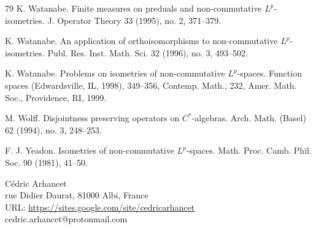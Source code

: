 \documentclass[leqno]{article} %
\numberwithin{equation}{section}
\begin{document}
\begin{thebibliography}{79}
K. Watanabe.
\newblock Finite measures on preduals and non-commutative $L^p$-isometries.
\newblock J. Operator Theory 33 (1995), no. 2, 371--379.

K. Watanabe.
\newblock An application of orthoisomorphisms to non-commutative $L^p$-isometries.
\newblock Publ. Res. Inst. Math. Sci. 32 (1996), no. 3, 493--502.

K. Watanabe.
\newblock Problems on isometries of non-commutative $L^p$-spaces.
\newblock Function spaces (Edwardsville, IL, 1998), 349--356, Contemp. Math., 232, Amer. Math. Soc., Providence, RI, 1999.





M. Wolff.
\newblock Disjointness preserving operators on $C^*$-algebras.
\newblock Arch. Math. (Basel) 62 (1994), no. 3, 248--253.


F. J. Yeadon.
\newblock Isometries of non-commutative $L^p$-spaces.
\newblock Math. Proc. Camb. Phil. Soc. 90 (1981), 41--50.
      

\end{thebibliography}


\vspace{0.2cm}
\footnotesize{
\noindent C\'edric Arhancet\\ 
 rue Didier Daurat, 81000 Albi, France\\
URL: \href{http://sites.google.com/site/cedricarhancet}{https://sites.google.com/site/cedricarhancet}\\
cedric.arhancet@protonmail.com\\

}
\end{document}
